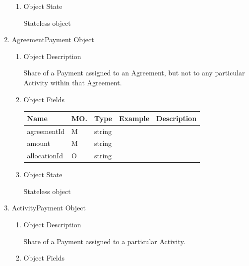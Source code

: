 \begin{enumerate}
\begin{enumerate}
\item Object State

Stateless object

\end{enumerate}

\item AgreementPayment Object

\begin{enumerate}

\item Object Description

Share of a Payment assigned to an Agreement, but not to any particular Activity within that Agreement.

\item Object Fields

\begin{table}[H]
\footnotesize

\begin{center}
\begin{tabular}{|p{3cm}|l|p{3cm}|p{3cm}|p{4cm}|} 
\hline
\rowcolor{lightgray}	Name	& MO.	& Type	& Example & 	Description \\
\hline

agreementId		& M & string				&							& 							\\
\hline

amount			& M & string				&							& 							\\
\hline

allocationId	& O & string				&							& 							\\
\hline

\end{tabular}
\end{center}
\end{table}

\item Object State

Stateless object

\end{enumerate}

\item ActivityPayment Object

\begin{enumerate}

\item Object Description

Share of a Payment assigned to a particular Activity.

\item Object Fields


\end{enumerate}
\end{enumerate}
